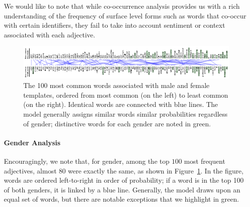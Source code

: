 \documentclass[11pt]{article}
\begin{document}
We would like to note that while co-occurrence analysis provides us with a rich understanding of the frequency of surface level forms such as words that co-occur with certain identifiers, they fail to take into account sentiment or context associated with each adjective.


\begin{figure}
    \centering
    \includegraphics[width=1\linewidth]{gender_words.pdf}
    \caption{The 100 most common words associated with male and female templates, ordered from most common (on the left) to least common (on the right). Identical words are connected with blue lines. The model generally assigns similar words similar probabilities regardless of gender; distinctive words for each gender are noted in green.}
    \label{fig:words}
\end{figure}

\paragraph{Gender Analysis} Encouragingly, we note that, for gender, among the top $100$ most frequent adjectives, almost $80$ were exactly the same, as shown in Figure~\ref{fig:words}.  In the figure, words are ordered left-to-right in order of probability; if a word is in the top 100 of both genders, it is linked by a blue line.  Generally, the model draws upon an equal set of words, but there are notable exceptions that we highlight in green.
\end{document}
